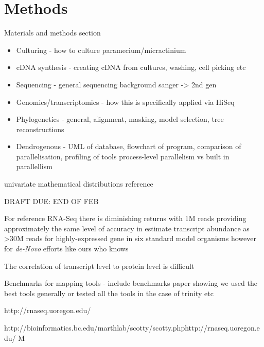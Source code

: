 \graphicspath{{chapters/2.Methods/figures}}

\chapter{Methods}

Materials and methods section

\begin{itemize}
    \item Culturing - how to culture paramecium/micractinium
    \item cDNA synthesis - creating cDNA from cultures, washing, cell picking etc
    \item Sequencing - general sequencing background sanger -> 2nd gen
    \item Genomics/transcriptomics - how this is specifically applied via HiSeq
    \item Phylogenetics - general, alignment, masking, model selection, tree reconstructions 
    \item Dendrogenous - UML of database, flowchart of program, comparison of parallelisation, profiling of tools process-level parallelism vs built in parallellism
\end{itemize}

univariate mathematical distributions reference\citep{Leemis2008}

%
%
%
%
%
%

DRAFT DUE: END OF FEB



 
For reference RNA-Seq there is diminishing returns with 1M reads providing approximately the same level of accuracy in estimate transcript abundance as >30M reads for highly-expressed gene in six standard model organisms \citep{Lei2014} however for \textit{de-Novo} efforts like ours who knows



The correlation of transcript level to protein level is difficult


Benchmarks for mapping tools - include benchmarks paper showing we used the best tools generally or tested all the tools in the case of trinity etc

http://rnaseq.uoregon.edu/

http://bioinformatics.bc.edu/marthlab/scotty/scotty.phphttp://rnaseq.uoregon.edu/
M

